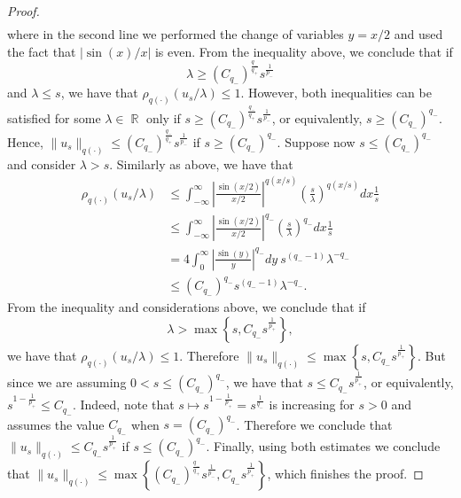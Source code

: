 \documentclass[11pt,reqno]{amsart}
\theoremstyle{definition}
\theoremstyle{definition}
\theoremstyle{definition}
\DeclareMathOperator{\R}{\mathbb{R}}
\begin{document}
\begin{proof}
\begin{align*}
    \end{align*}
     where in the second line we performed the change of variables $y=x/2$ and used the fact that $|\sin(x)/x|$ is even. From the inequality above, we conclude that if 
   \begin{equation}\label{lambda_p_->1}
\lambda\geq  (C_{q_{-}})^{\frac{q_{-}}{q_{+}}}s^{\frac{1}{p_{-}}}
   \end{equation}
   and 
   $\lambda\leq s$,
   we have that $\rho_{q(\cdot)}(u_s/\lambda)\leq 1$.
   However, both inequalities can be satisfied for some $\lambda\in \R$ only if $s\geq  (C_{q_{-}})^{\frac{q_{-}}{q_{+}}}s^{\frac{1}{p_{-}}}$, or equivalently, $s\geq (C_{q_{-}})^{q_{-}}$. Hence, $ \|u_s\|_{q(\cdot)}\leq(C_{q_{-}})^{\frac{q_{-}}{q_{+}}}s^{\frac{1}{p_{-}}}$ if $s\geq (C_{q_{-}})^{q_{-}}$.
Suppose now $s\leq (C_{q_{-}})^{q_{-}}$ and consider $\lambda>s$. Similarly as above, we have that
     \begin{align*}
        \rho_{q(\cdot)}(u_s/\lambda)&\leq \int_{-\infty}^{\infty}\left|\frac{\sin(x/2)}{x/2}\right|^{q(x/s)}\left(\frac{s}{\lambda}\right)^{q(x/s)}dx\frac{1}{s}%
        \\
       &\leq \int_{-\infty}^{\infty}\left|\frac{\sin(x/2)}{x/2}\right|^{q_{-}}\left(\frac{s}{\lambda}\right)^{q_{-}}dx\frac{1}{s}%
       \\
       &=4\int_0^{\infty}\left|\frac{\sin(y)}{y}\right|^{q_{-}}dy\ s^{(q_{-}-1)}\lambda^{-q_{-}}%
       \\
       &\leq (C_{q_{-}})^{q_{-}}s^{(q_{-}-1)}\lambda^{-q_{-}}.
    \end{align*}
   From the inequality and considerations  above, we conclude that if 
   \begin{equation*}
\lambda> \max\left\{s,C_{q_{-}}s^{\frac{1}{p_{+}}}\right\},
   \end{equation*}
   we have that $\rho_{q(\cdot)}(u_s/\lambda)\leq 1$.
 Therefore $\|u_s\|_{q(\cdot)}\leq  \max\left\{s,C_{q_{-}}s^{\frac{1}{p_{+}}}\right\}$. But since we are assuming $0<s\leq (C_{q_{-}})^{q_{-}}$, we have that $s\leq C_{q_{-}}s^{\frac{1}{p_{+}}}$, or equivalently, $s^{1-\frac{1}{p_{+}}}\leq C_{q_{-}}$. Indeed, note that $s\mapsto s^{1-\frac{1}{p_{+}}}=s^{\frac{1}{q_{-}}}$ is increasing for $s>0$ and assumes the value $C_{q_{-}}$ when $ s=(C_{q_{-}})^{q_{-}}$.
 Therefore 
 we conclude that $\|u_s\|_{q(\cdot)}\leq C_{q_{-}}s^{\frac{1}{p_{+}}}$ if $s\leq (C_{q_{-}})^{q_{-}}$. Finally, using both estimates we conclude that   $\|u_s\|_{q(\cdot)}\leq  \max\left\{(C_{q_{-}})^{\frac{q_{-}}{q_{+}}}s^{\frac{1}{p_{-}}},C_{q_{-}}s^{\frac{1}{p_{+}}}\right\}$, which finishes the proof.
\end{proof}
\end{document}
